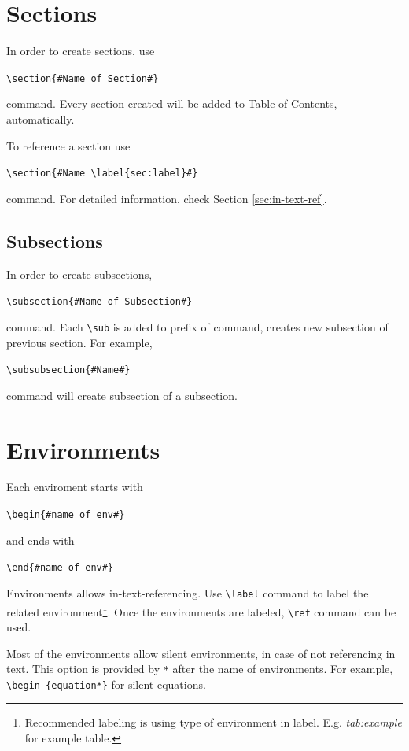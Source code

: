 \documentclass[a4paper,12pt]{article}
\newcommand{\writecommand}[2]{
    \begin{center}
        \texttt{\textbackslash #1\{\##2\#\}} \\
    \end{center}
}
\begin{document}
%
%
\maketitle

\makeabstract

\maketableofcontents

\setcounter{page}{1} %


%
%

\section{Sections}
In order to create sections, use \writecommand{section}{Name of Section} command. Every section created will be added to Table of Contents, automatically. 

To reference a section use \writecommand{section}{Name \textbackslash label\{sec:label\}}
command. For detailed information, check Section \ref{sec:in-text-ref}.

\subsection{Subsections}
In order to create subsections, \writecommand{subsection}{Name of Subsection} command. Each \texttt{\textbackslash sub} is added to prefix of command, creates new subsection of previous section. For example, \writecommand{subsubsection}{Name} command will create subsection of a subsection.

\section{Environments}
Each enviroment starts with \writecommand{begin}{name of env} and ends with \writecommand{end}{name of env} Environments allows in-text-referencing. Use \texttt{\textbackslash label} command to label the related environment\footnote{Recommended labeling is using type of environment in label. E.g. \textit{tab:example} for example table.}. Once the environments are labeled, \texttt{\textbackslash ref} command can be used. 

Most of the environments allow silent environments, in case of not referencing in text. This option is provided by \texttt{*} after the name of environments. For example, \texttt{\textbackslash begin \{equation*\}} for silent equations.
\end{document}
